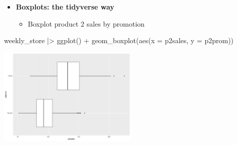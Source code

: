 \documentclass[
  ignorenonframetext,
]{beamer}
\newenvironment{Shaded}{\begin{snugshade}}{\end{snugshade}}
\newcommand{\AttributeTok}[1]{\textcolor[rgb]{0.40,0.45,0.13}{#1}}
\newcommand{\FunctionTok}[1]{\textcolor[rgb]{0.28,0.35,0.67}{#1}}
\newcommand{\NormalTok}[1]{\textcolor[rgb]{0.00,0.23,0.31}{#1}}
\newcommand{\SpecialCharTok}[1]{\textcolor[rgb]{0.37,0.37,0.37}{#1}}
\providecommand{\tightlist}{%
  \setlength{\itemsep}{0pt}\setlength{\parskip}{0pt}}\usepackage{longtable,booktabs,array}
\begin{document}
\begin{frame}[fragile]{}
\label{section-25}
\begin{itemize}
\item
  \textbf{Boxplots: the tidyverse way}

  \begin{itemize}
  \tightlist
  \item
    Boxplot product 2 sales by promotion
  \end{itemize}
\end{itemize}

\tiny

\begin{Shaded}
\begin{Highlighting}[]
\NormalTok{weekly\_store }\SpecialCharTok{|\textgreater{}} \FunctionTok{ggplot}\NormalTok{() }\SpecialCharTok{+} 
  \FunctionTok{geom\_boxplot}\NormalTok{(}\FunctionTok{aes}\NormalTok{(}\AttributeTok{x =}\NormalTok{ p2sales, }\AttributeTok{y =}\NormalTok{ p2prom))}
\end{Highlighting}
\end{Shaded}

\begin{center}
\includegraphics[width=0.5\textwidth,height=\textheight]{003_describing_data_files/figure-beamer/unnamed-chunk-24-1.pdf}
\end{center}
\end{frame}
\end{document}
